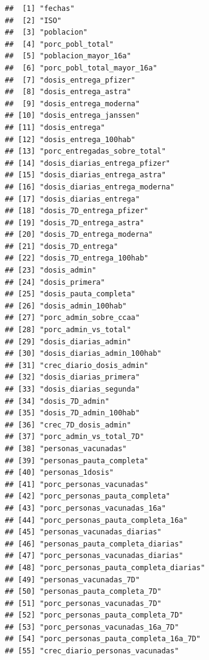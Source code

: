\documentclass[11pt,]{book}
\begin{document}
\begin{verbatim}
##  [1] "fechas"                              
##  [2] "ISO"                                 
##  [3] "poblacion"                           
##  [4] "porc_pobl_total"                     
##  [5] "poblacion_mayor_16a"                 
##  [6] "porc_pobl_total_mayor_16a"           
##  [7] "dosis_entrega_pfizer"                
##  [8] "dosis_entrega_astra"                 
##  [9] "dosis_entrega_moderna"               
## [10] "dosis_entrega_janssen"               
## [11] "dosis_entrega"                       
## [12] "dosis_entrega_100hab"                
## [13] "porc_entregadas_sobre_total"         
## [14] "dosis_diarias_entrega_pfizer"        
## [15] "dosis_diarias_entrega_astra"         
## [16] "dosis_diarias_entrega_moderna"       
## [17] "dosis_diarias_entrega"               
## [18] "dosis_7D_entrega_pfizer"             
## [19] "dosis_7D_entrega_astra"              
## [20] "dosis_7D_entrega_moderna"            
## [21] "dosis_7D_entrega"                    
## [22] "dosis_7D_entrega_100hab"             
## [23] "dosis_admin"                         
## [24] "dosis_primera"                       
## [25] "dosis_pauta_completa"                
## [26] "dosis_admin_100hab"                  
## [27] "porc_admin_sobre_ccaa"               
## [28] "porc_admin_vs_total"                 
## [29] "dosis_diarias_admin"                 
## [30] "dosis_diarias_admin_100hab"          
## [31] "crec_diario_dosis_admin"             
## [32] "dosis_diarias_primera"               
## [33] "dosis_diarias_segunda"               
## [34] "dosis_7D_admin"                      
## [35] "dosis_7D_admin_100hab"               
## [36] "crec_7D_dosis_admin"                 
## [37] "porc_admin_vs_total_7D"              
## [38] "personas_vacunadas"                  
## [39] "personas_pauta_completa"             
## [40] "personas_1dosis"                     
## [41] "porc_personas_vacunadas"             
## [42] "porc_personas_pauta_completa"        
## [43] "porc_personas_vacunadas_16a"         
## [44] "porc_personas_pauta_completa_16a"    
## [45] "personas_vacunadas_diarias"          
## [46] "personas_pauta_completa_diarias"     
## [47] "porc_personas_vacunadas_diarias"     
## [48] "porc_personas_pauta_completa_diarias"
## [49] "personas_vacunadas_7D"               
## [50] "personas_pauta_completa_7D"          
## [51] "porc_personas_vacunadas_7D"          
## [52] "porc_personas_pauta_completa_7D"     
## [53] "porc_personas_vacunadas_16a_7D"      
## [54] "porc_personas_pauta_completa_16a_7D" 
## [55] "crec_diario_personas_vacunadas"      

\end{verbatim}
\end{document}
